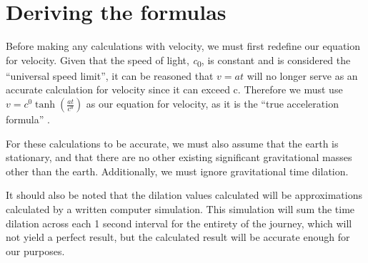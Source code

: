 \section{Deriving the formulas}
	Before making any calculations with velocity, we must first redefine our equation for velocity. Given that the speed of
	light, \si{\clight}, is constant and is considered the ``universal speed limit'', it can be reasoned that $v=at$ will no longer serve
	as an accurate calculation for velocity since it can exceed c. Therefore we must use $v=\si{\clight} \tanh\left(\frac{at}{\si{\clight}}\right)$ as our equation for 
	velocity, as it is the ``true acceleration formula'' \autocite{sracceleration}.

	For these calculations to be accurate, we must also assume that the earth is stationary, and that there are no other existing significant
	gravitational masses other than the earth. Additionally, we must ignore gravitational time dilation.

	It should also be noted that the dilation values calculated will be approximations calculated by a written computer simulation. This
	simulation will sum the time dilation across each 1 second interval for the entirety of the journey, which will not yield a perfect
	result, but the calculated result will be accurate enough for our purposes.
